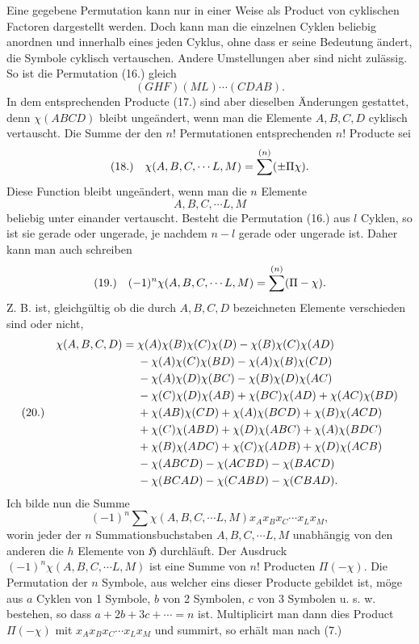 \documentclass[11pt]{article}
\makeatletter
\newcommand{\Hgrp}{\mathfrak{H}}
\newcommand{\frobtag}[2]{\[\begin{array}{@{}r@{\quad}l@{}}\textup{(#1)} & \displaystyle #2\end{array}\]}
\newcommand{\frobtagc}[2]{\[\begin{array}{@{}r@{\quad}c@{}}\textup{(#1)} & \displaystyle #2\end{array}\]}
\makeatother
\begin{document}
Eine gegebene Permutation kann nur in einer Weise als Product von cyklischen Factoren dargestellt werden. Doch kann man die einzelnen Cyklen beliebig anordnen und innerhalb eines jeden Cyklus, ohne dass er seine Bedeutung ändert, die Symbole cyklisch vertauschen. Andere Umstellungen aber sind nicht zulässig. So ist die Permutation (16.) gleich
\[
(GHF)(ML)\cdots(CDAB).
\]
In dem entsprechenden Producte (17.) sind aber dieselben Änderungen gestattet, denn $\chi(ABCD)$ bleibt ungeändert, wenn man die Elemente $A,B,C,D$ cyklisch vertauscht. Die Summe der den $n!$ Permutationen entsprechenden $n!$ Producte sei
\frobtagc{18.}{\chi(A,B,C,\cdots L,M)=\sum^{(n)}(\pm\Pi\chi).}
Diese Function bleibt ungeändert, wenn man die $n$ Elemente
\[
A,B,C,\cdots L,M
\]
beliebig unter einander vertauscht. Besteht die Permutation (16.) aus $l$ Cyklen, so ist sie gerade oder ungerade, je nachdem $n-l$ gerade oder ungerade ist. Daher kann man auch schreiben
\frobtagc{19.}{(-1)^n\chi(A,B,C,\cdots L,M)=\sum^{(n)}(\Pi-\chi).}
Z. B. ist, gleichgültig ob die durch $A,B,C,D$ bezeichneten Elemente verschieden sind oder nicht,
\frobtag{20.}{\begin{aligned}
\chi(A,B,C,D)={}&\chi(A)\chi(B)\chi(C)\chi(D)-\chi(B)\chi(C)\chi(AD)\nobreak\\
&{}-\chi(A)\chi(C)\chi(BD)-\chi(A)\chi(B)\chi(CD)\nobreak\\
&{}-\chi(A)\chi(D)\chi(BC)-\chi(B)\chi(D)\chi(AC)\nobreak\\
&{}-\chi(C)\chi(D)\chi(AB)+\chi(BC)\chi(AD)+\chi(AC)\chi(BD)\nobreak\\
&{}+\chi(AB)\chi(CD)+\chi(A)\chi(BCD)+\chi(B)\chi(ACD)\nobreak\\
&{}+\chi(C)\chi(ABD)+\chi(D)\chi(ABC)+\chi(A)\chi(BDC)\nobreak\\
&{}+\chi(B)\chi(ADC)+\chi(C)\chi(ADB)+\chi(D)\chi(ACB)\nobreak\\
&{}-\chi(ABCD)-\chi(ACBD)-\chi(BACD)\nobreak\\
&{}-\chi(BCAD)-\chi(CABD)-\chi(CBAD).
\end{aligned}}
Ich bilde nun die Summe
\[
(-1)^n\sum\chi(A,B,C,\cdots L,M)x_Ax_Bx_C\cdots x_Lx_M,
\]
worin jeder der $n$ Summationsbuchstaben $A,B,C,\cdots L,M$ unabhängig von den anderen die $h$ Elemente von $\Hgrp$ durchläuft. Der Ausdruck $(-1)^n\chi(A,B,C,\cdots L,M)$ ist eine Summe von $n!$ Producten $\Pi(-\chi)$. Die Permutation der $n$ Symbole, aus welcher eins dieser Producte gebildet ist, möge aus $a$ Cyklen von 1 Symbole, $b$ von 2 Symbolen, $c$ von 3 Symbolen u. s. w. bestehen, so dass $a+2b+3c+\cdots=n$ ist. Multiplicirt man dann dies Product $\Pi(-\chi)$ mit $x_Ax_Bx_C\cdots x_Lx_M$ und summirt, so erhält man nach (7.)
\end{document}
